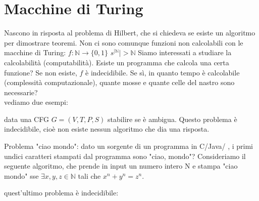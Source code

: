 	\chapter{Macchine di Turing}
	Nascono in risposta al problema di Hilbert, che si chiedeva se esiste un algoritmo per dimostrare teoremi. Non ci sono comunque funzioni non calcolabili con le macchine di Turing:
	$f:\mathbb{N}\to\{0,1\}\,\,s^{|\mathbb{N}}|>\mathbb{N}$
	Siamo interessati a studiare la calcolabilità (computabilità).
	Esiste un programma che calcola una certa funzione? Se non esiste, $f$ è indecidibile. Se sì, in quanto tempo è calcolabile (complessità computazionale), quante mosse e quante celle del nastro sono necessarie?\\
	vediamo due esempi:
	\begin{example}
		data una CFG $G=(V,T,P,S)$ stabilire se è ambigua. Questo problema è indecidibile, cioè non esiste nessun algoritmo che dia una risposta.
	\end{example}
	\begin{example}
		Problema "ciao mondo": dato un sorgente di un programma in C/Java/ , i primi undici caratteri
		stampati dal programma sono "ciao, mondo"?
		Consideriamo il seguente algoritmo, che prende in input un numero intero N e stampa "ciao mondo" sse
		$\exists x,y,z\in \mathbb{N}$ tali che
		$x^n+y^n=z^n$.
	\end{example}
	quest'ultimo problema è indecidibile:
